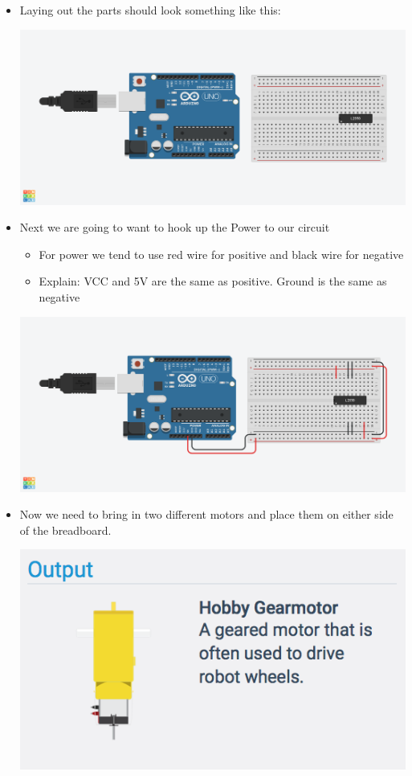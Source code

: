 \documentclass[12pt]{article}
\begin{document}
\begin{itemize}
		\item Laying out the parts should look something like this:
		\begin{center}
			\includegraphics[scale = 0.3]{./Images/circuit1}
		\end{center}
		\item Next we are going to want to hook up the Power to our circuit
			\begin{itemize}
				\item For power we tend to use red wire for positive and black wire for negative
				\item Explain: VCC and 5V are the same as positive.  Ground is the same as negative
			\end{itemize}
		\begin{center}
			\includegraphics[scale = 0.3]{./Images/circuit2}
		\end{center}
		\item Now we need to bring in two different motors and place them on either side of the breadboard.  
		\begin{center}
			\includegraphics[scale = 0.7]{./Images/motor}

\end{center}
\end{itemize}
\end{document}
